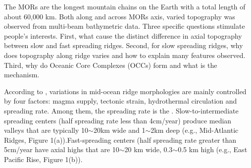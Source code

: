 \documentclass[12pt]{article}
\begin{document}
The MORs are the longest mountain chains on the Earth with a total length of about 60,000 km. Both along and across MORs axis, varied topography was observed from multi-beam bathymetric data. Three specific questions stimulate people's interests. First, what cause the distinct difference in axial topography between slow and fast spreading ridges. Second, for slow spreading ridges, why does topography  along ridge varies and how to explain many features observed. Third, why do Oceanic Core Complexes (OCCs) form and what is the mechanism. 

According to \citep{Fowler2004}, variations in  mid-ocean ridge morphologies are mainly controlled by four factors: magma supply, tectonic strain, hydrothermal circulation and spreading rate. Among them, the spreading rate is the . Slow-to-intermediate spreading centers (half spreading rate less than 4cm/year) produce median valleys that are typically 10$\sim$20km wide and 1$\sim$2km deep (e.g., Mid-Atlantic Ridges, Figure 1(a)).Fast-spreading centers (half spreading rate greater than 5cm/year have axial highs that are 10$\sim$20 km wide, 0.3$\sim$0.5 km high (e.g., East Pacific Rise, Figure 1(b)).
\end{document}
